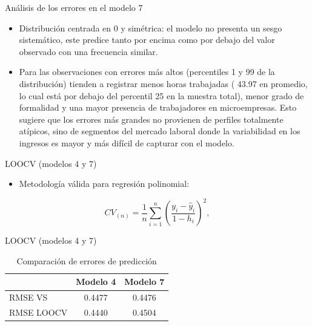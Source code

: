 \documentclass[11pt]{beamer}
\begin{document}
\begin{frame}{Análisis de los errores en el modelo 7}

\begin{itemize}
    \item Distribución centrada en 0 y simétrica: el modelo no presenta un sesgo sistemático, este predice tanto por encima como por debajo del valor observado con una frecuencia similar.
    \item Para las observaciones con errores más altos (percentiles 1 y 99 de la distribución) tienden a registrar menos horas trabajadas ( 43.97 en promedio, lo cual está por debajo del percentil 25 en la muestra total), menor grado de formalidad y una mayor presencia de trabajadores en microempresas. Esto sugiere que los errores más grandes no provienen de perfiles totalmente atípicos, sino de segmentos del mercado laboral donde la variabilidad en los ingresos es mayor y más difícil de capturar con el modelo. 
\end{itemize}
    
\end{frame}

\begin{frame}{LOOCV (modelos 4 y 7)}
\begin{itemize}
    
\item Metodología válida para regresión polinomial:
\end{itemize}
\[
CV_{(n)} = \frac{1}{n} \sum_{i=1}^{n} \left( \frac{y_i - \hat{y}_i}{1 - h_i} \right)^{2},
\]
    
\end{frame}

\begin{frame}{LOOCV (modelos 4 y 7)}

\begin{table}[H]
\centering
\begin{tabular}{lcc}
\hline
                 & Modelo 4 & Modelo 7 \\
\hline
RMSE VS          &    0.4477      &    0.4476       \\
RMSE LOOCV       &    0.4440      &    0.4504      \\
\hline
\end{tabular}
\caption{Comparación de errores de predicción}
\end{table}
    
\end{frame}
\end{document}
